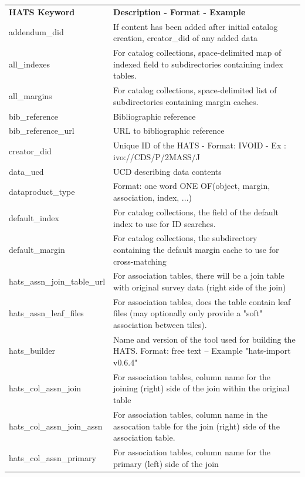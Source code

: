 \documentclass[11pt,a4paper]{ivoa}
\begin{document}
{\footnotesize
\begin{longtable}[h!]{D{0.33\textwidth} D{0.67\textwidth}}
\sptablerule
\textbf{HATS Keyword}&\textbf{Description - Format - Example}\\
\sptablerule
\endhead

addendum\_did &If content has been added after initial catalog creation, creator\_did of any added data \\
all\_indexes &For catalog collections, space-delimited map of indexed field to subdirectories containing index tables. \\
all\_margins &For catalog collections, space-delimited list of subdirectories containing margin caches. \\
bib\_reference &Bibliographic reference \\
bib\_reference\_url &URL to bibliographic reference \\
creator\_did &Unique ID of the HATS - Format: IVOID - Ex : ivo://CDS/P/2MASS/J \\
data\_ucd &UCD describing data contents \citep{ucd1plus2024} \\
dataproduct\_type &Format: one word ONE OF(object, margin, association, index, ...) \\
default\_index &For catalog collections, the field of the default index to use for ID searches. \\
default\_margin &For catalog collections, the subdirectory containing the default margin cache to use for cross-matching \\
hats\_assn\_join\_table\_url &For association tables, there will be a join table with original survey data (right side of the join) \\
hats\_assn\_leaf\_files &For association tables, does the table contain leaf files (may optionally only provide a "soft" association between tiles). \\
hats\_builder &Name and version of the tool used for building the HATS. Format: free text -- Example "hats-import v0.6.4" \\
hats\_col\_assn\_join &For association tables, column name for the joining (right) side of the join within the original table \\
hats\_col\_assn\_join\_assn &For association tables, column name in the assocation table for the join (right) side of the association table. \\
hats\_col\_assn\_primary &For association tables, column name for the primary (left) side of the join \\

\end{longtable}}
\end{document}
